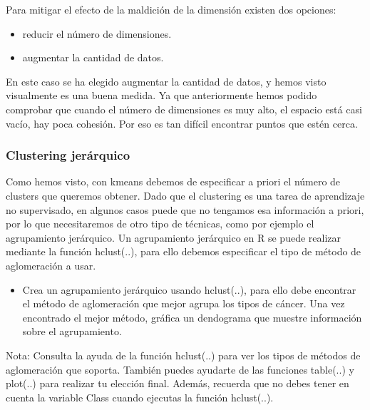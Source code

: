 \documentclass[
]{article}
\providecommand{\tightlist}{%
  \setlength{\itemsep}{0pt}\setlength{\parskip}{0pt}}
\begin{document}
Para mitigar el efecto de la maldición de la dimensión existen dos
opciones:

\begin{itemize}
\tightlist
\item
  reducir el número de dimensiones.
\item
  augmentar la cantidad de datos.
\end{itemize}

En este caso se ha elegido augmentar la cantidad de datos, y hemos visto
visualmente es una buena medida. Ya que anteriormente hemos podido
comprobar que cuando el número de dimensiones es muy alto, el espacio
está casi vacío, hay poca cohesión. Por eso es tan difícil encontrar
puntos que estén cerca.

\hypertarget{clustering-jeruxe1rquico}{%
\subsubsection{Clustering jerárquico}\label{clustering-jeruxe1rquico}}

Como hemos visto, con kmeans debemos de especificar a priori el número
de clusters que queremos obtener. Dado que el clustering es una tarea de
aprendizaje no supervisado, en algunos casos puede que no tengamos esa
información a priori, por lo que necesitaremos de otro tipo de técnicas,
como por ejemplo el agrupamiento jerárquico. Un agrupamiento jerárquico
en R se puede realizar mediante la función hclust(..), para ello debemos
especificar el tipo de método de aglomeración a usar.

\begin{itemize}
\tightlist
\item
  Crea un agrupamiento jerárquico usando hclust(..), para ello debe
  encontrar el método de aglomeración que mejor agrupa los tipos de
  cáncer. Una vez encontrado el mejor método, gráfica un dendograma que
  muestre información sobre el agrupamiento.
\end{itemize}

Nota: Consulta la ayuda de la función hclust(..) para ver los tipos de
métodos de aglomeración que soporta. También puedes ayudarte de las
funciones table(..) y plot(..) para realizar tu elección final. Además,
recuerda que no debes tener en cuenta la variable Class cuando ejecutas
la función hclust(..).
\end{document}
